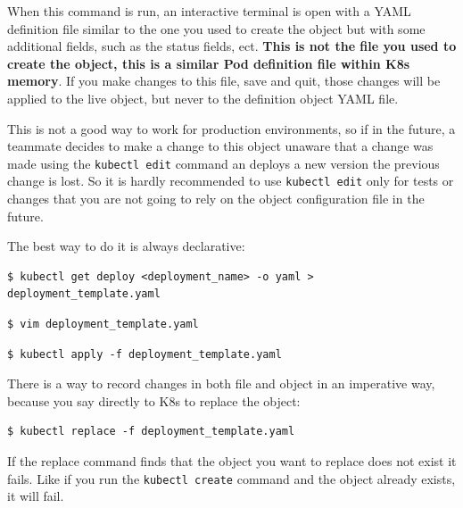 \documentclass{article}
\newenvironment{blocktemplateII}[1]{%
    \tcolorbox[beamer,%
    noparskip,breakable,
    colframe=Green,%
    colbacklower=LimeGreen!75!LightGreen,%
    title=#1]}%
    {\endtcolorbox}
\newenvironment{codetemplate}[1][]{%
  \mybasecolorbox[#1]
  \itshape
}{%
  \endmybasecolorbox
}
\begin{document}
When this command is run, an interactive terminal is open with a YAML definition file similar to the one you used to create the object but with some additional fields, such as the status fields, ect. \textbf{This is not the file you used to create the object, this is a similar Pod definition file within K8s memory}. If you make changes to this file, save and quit, those changes will be applied to the live object, but never to the definition object YAML file.

This is not a good way to work for production environments, so if in the future, a teammate decides to make a change to this object unaware that a change was made using the \verb|kubectl edit| command an deploys a new version the previous change is lost. So it is hardly recommended to use \verb|kubectl edit| only for tests or changes that you are not going to rely on the object configuration file in the future.

The best way to do it is always declarative:
\begin{codetemplate}{}
\begin{verbatim}
$ kubectl get deploy <deployment_name> -o yaml > deployment_template.yaml
\end{verbatim}
\end{codetemplate}
\begin{codetemplate}{}
\begin{verbatim}
$ vim deployment_template.yaml
\end{verbatim}
\end{codetemplate}
\begin{codetemplate}{}
\begin{verbatim}
$ kubectl apply -f deployment_template.yaml
\end{verbatim}
\end{codetemplate}

\begin{blocktemplateII}{NOTE}
There is a way to record changes in both file and object in an imperative way, because you say directly to K8s to replace the object:
\begin{codetemplate}{}
\begin{verbatim}
$ kubectl replace -f deployment_template.yaml
\end{verbatim}
\end{codetemplate}
If the replace command finds that the object you want to replace does not exist it fails. Like if you run the \verb|kubectl create| command and the object already exists, it will fail.
\end{blocktemplateII}
\end{document}
